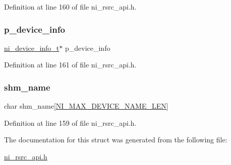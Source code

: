 Definition at line 160 of file ni\+\_\+rsrc\+\_\+api.\+h.

\mbox{\label{struct__ni__device__context_a68d7bd7ca36633b8821d38d967baf70e}} 
\subsubsection{\texorpdfstring{p\_device\_info}{p\_device\_info}}
{\footnotesize\ttfamily \mbox{\hyperlink{ni__rsrc__api_8h_a37a9b9f89ba495d469222af27ce3058b}{ni\+\_\+device\+\_\+info\+\_\+t}}$\ast$ p\+\_\+device\+\_\+info}



Definition at line 161 of file ni\+\_\+rsrc\+\_\+api.\+h.

\mbox{\label{struct__ni__device__context_ada1a7b89b3d42ee9de8937df9ee48e12}} 
\subsubsection{\texorpdfstring{shm\_name}{shm\_name}}
{\footnotesize\ttfamily char shm\+\_\+name\mbox{[}\mbox{\hyperlink{ni__rsrc__api_8h_a38deaa045e5ce61a183c8ceddc618d7e}{N\+I\+\_\+\+M\+A\+X\+\_\+\+D\+E\+V\+I\+C\+E\+\_\+\+N\+A\+M\+E\+\_\+\+L\+EN}}\mbox{]}}



Definition at line 159 of file ni\+\_\+rsrc\+\_\+api.\+h.



The documentation for this struct was generated from the following file\+:\begin{DoxyCompactItemize}
\item 
\mbox{\hyperlink{ni__rsrc__api_8h}{ni\+\_\+rsrc\+\_\+api.\+h}}\end{DoxyCompactItemize}
